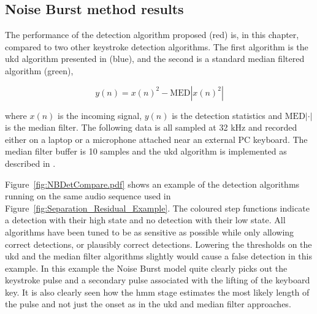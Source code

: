 \subsection{Noise Burst method results}\label{sec:WPdetectionNBresults}
The performance of the detection algorithm proposed (red) is, in this chapter, compared to two other keystroke detection algorithms. The first algorithm is the \gls{ukd} algorithm presented in \cite{Subramanya2007} (blue), and the second is a standard median filtered algorithm (green),

\begin{equation}
y(n) = x(n)^2 - \textrm{MED}\left|x(n)^2\right|
\end{equation}

where $x(n)$ is the incoming signal, $y(n)$ is the detection statistics and $\textrm{MED}\left|\cdot \right|$ is
the median filter. The following data is all sampled at 32 kHz and recorded either on a laptop or a microphone attached near an external PC keyboard. The median filter buffer is 10 samples and the \gls{ukd} algorithm is implemented as described in \cite{Subramanya2007}.

Figure~\ref{fig:NBDetCompare.pdf} shows an example of the detection algorithms running on the same audio sequence used in Figure~\ref{fig:Separation_Residual_Example}. The coloured step functions indicate a detection with their high state and no detection with their low state. All algorithms have been tuned to be as sensitive as possible while only allowing correct detections, or plausibly correct detections. Lowering the thresholds on the \gls{ukd} and the median filter algorithms slightly would cause a false detection in this example. In this example the Noise Burst model quite clearly picks out the keystroke pulse and a secondary pulse associated with the lifting of the keyboard key. It is also clearly seen how the \gls{hmm} stage estimates the most likely length of the pulse and not just the onset as in the \gls{ukd} and median filter approaches.

